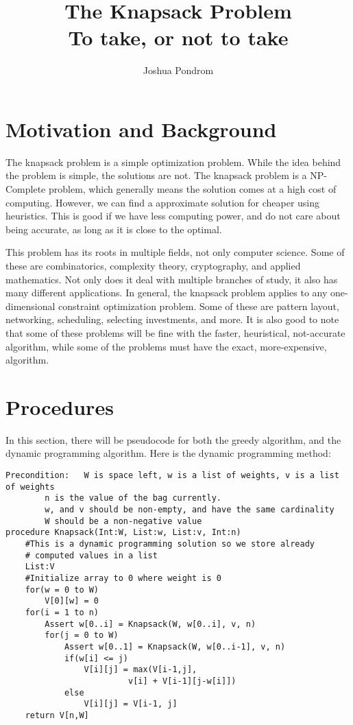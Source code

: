 \documentclass{article}
\begin{document}
\title{The Knapsack Problem\\\large To take, or not to take}
\author{Joshua Pondrom}
\maketitle

\section{Motivation and Background}
The knapsack problem is a simple optimization problem. While the idea behind
the problem is simple, the solutions are not. The knapsack problem is a 
NP-Complete problem, which generally means the solution comes at a high cost
of computing. However, we can find a approximate solution for cheaper using
heuristics. This is good if we have less computing power, and do not care
about being accurate, as long as it is close to the optimal.

This problem has its roots in multiple fields, not only computer science. Some 
of these are combinatorics, complexity theory, cryptography, and applied
mathematics. Not only does it deal with multiple branches of study, it also has
many different applications. In general, the knapsack problem applies to any
one-dimensional constraint optimization problem. Some of these are pattern
layout, networking, scheduling, selecting investments, and more. It is also
good to note that some of these problems will be fine with the faster, 
heuristical, not-accurate algorithm, while some of the problems must have
the exact, more-expensive, algorithm.
\section{Procedures}
In this section, there will be pseudocode for both the greedy algorithm, and the
dynamic programming algorithm. Here is the dynamic programming method:
\newpage
\begin{lstlisting}
Precondition:	W is space left, w is a list of weights, v is a list of weights
		n is the value of the bag currently.
		w, and v should be non-empty, and have the same cardinality
		W should be a non-negative value
procedure Knapsack(Int:W, List:w, List:v, Int:n)
	#This is a dynamic programming solution so we store already
	# computed values in a list
	List:V
	#Initialize array to 0 where weight is 0
	for(w = 0 to W) 
		V[0][w] = 0
	for(i = 1 to n)
		Assert w[0..i] = Knapsack(W, w[0..i], v, n) 
		for(j = 0 to W)
			Assert w[0..1] = Knapsack(W, w[0..i-1], v, n)
			if(w[i] <= j)
				V[i][j] = max(V[i-1,j], 
					     v[i] + V[i-1][j-w[i]])
			else
				V[i][j] = V[i-1, j]
	return V[n,W]
\end{lstlisting}
\end{document}
